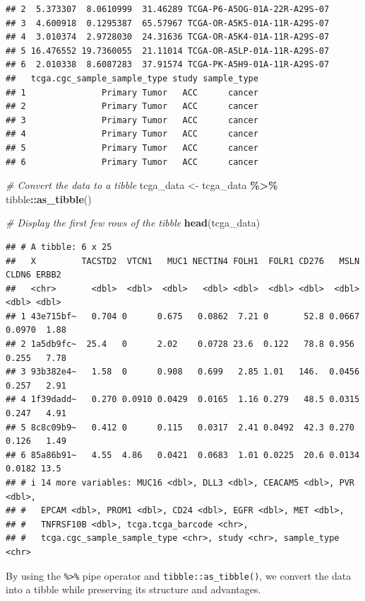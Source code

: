 \documentclass[
]{book}
\newenvironment{Shaded}{\begin{snugshade}}{\end{snugshade}}
\newcommand{\CommentTok}[1]{\textcolor[rgb]{0.56,0.35,0.01}{\textit{#1}}}
\newcommand{\FunctionTok}[1]{\textcolor[rgb]{0.13,0.29,0.53}{\textbf{#1}}}
\newcommand{\NormalTok}[1]{#1}
\newcommand{\OtherTok}[1]{\textcolor[rgb]{0.56,0.35,0.01}{#1}}
\newcommand{\SpecialCharTok}[1]{\textcolor[rgb]{0.81,0.36,0.00}{\textbf{#1}}}
\begin{document}
\begin{verbatim}
## 2  5.373307  8.0610999  31.46289 TCGA-P6-A5OG-01A-22R-A29S-07
## 3  4.600918  0.1295387  65.57967 TCGA-OR-A5K5-01A-11R-A29S-07
## 4  3.010374  2.9728030  24.31636 TCGA-OR-A5K4-01A-11R-A29S-07
## 5 16.476552 19.7360055  21.11014 TCGA-OR-A5LP-01A-11R-A29S-07
## 6  2.010338  8.6087283  37.91574 TCGA-PK-A5H9-01A-11R-A29S-07
##   tcga.cgc_sample_sample_type study sample_type
## 1               Primary Tumor   ACC      cancer
## 2               Primary Tumor   ACC      cancer
## 3               Primary Tumor   ACC      cancer
## 4               Primary Tumor   ACC      cancer
## 5               Primary Tumor   ACC      cancer
## 6               Primary Tumor   ACC      cancer
\end{verbatim}

\begin{Shaded}
\begin{Highlighting}[]
\CommentTok{\# Convert the data to a tibble}
\NormalTok{tcga\_data }\OtherTok{\textless{}{-}}\NormalTok{ tcga\_data }\SpecialCharTok{\%\textgreater{}\%} 
\NormalTok{  tibble}\SpecialCharTok{::}\FunctionTok{as\_tibble}\NormalTok{()}

\CommentTok{\# Display the first few rows of the tibble}
\FunctionTok{head}\NormalTok{(tcga\_data)}
\end{Highlighting}
\end{Shaded}

\begin{verbatim}
## # A tibble: 6 x 25
##   X         TACSTD2  VTCN1   MUC1 NECTIN4 FOLH1  FOLR1 CD276   MSLN  CLDN6 ERBB2
##   <chr>       <dbl>  <dbl>  <dbl>   <dbl> <dbl>  <dbl> <dbl>  <dbl>  <dbl> <dbl>
## 1 43e715bf~   0.704 0      0.675   0.0862  7.21 0       52.8 0.0667 0.0970  1.88
## 2 1a5db9fc~  25.4   0      2.02    0.0728 23.6  0.122   78.8 0.956  0.255   7.78
## 3 93b382e4~   1.58  0      0.908   0.699   2.85 1.01   146.  0.0456 0.257   2.91
## 4 1f39dadd~   0.270 0.0910 0.0429  0.0165  1.16 0.279   48.5 0.0315 0.247   4.91
## 5 8c8c09b9~   0.412 0      0.115   0.0317  2.41 0.0492  42.3 0.270  0.126   1.49
## 6 85a86b91~   4.55  4.86   0.0421  0.0683  1.01 0.0225  20.6 0.0134 0.0182 13.5 
## # i 14 more variables: MUC16 <dbl>, DLL3 <dbl>, CEACAM5 <dbl>, PVR <dbl>,
## #   EPCAM <dbl>, PROM1 <dbl>, CD24 <dbl>, EGFR <dbl>, MET <dbl>,
## #   TNFRSF10B <dbl>, tcga.tcga_barcode <chr>,
## #   tcga.cgc_sample_sample_type <chr>, study <chr>, sample_type <chr>
\end{verbatim}

By using the \texttt{\%\textgreater{}\%} pipe operator and \texttt{tibble::as\_tibble()}, we convert the data into a tibble while preserving its structure and advantages.
\end{document}
